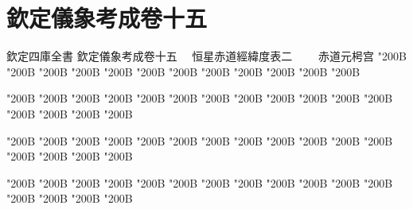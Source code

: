 \chapter*{欽定儀象考成卷十五}
\begin{正文}
欽定四庫全書
欽定儀象考成卷十五
　恒星赤道經緯度表二
　　赤道元枵宫
\char"200B\relax{}
\char"200B\relax{}
\char"200B\relax{}
\char"200B\relax{}
\char"200B\relax{}
\char"200B\relax{}
\char"200B\relax{}
\char"200B\relax{}
\char"200B\relax{}
\char"200B\relax{}
\char"200B\relax{}
\char"200B\relax
\par
\end{正文}\clearpage
{}
\begin{正文}
\char"200B\relax{}
\char"200B\relax{}
\char"200B\relax{}
\char"200B\relax{}
\char"200B\relax{}
\char"200B\relax{}
\char"200B\relax{}
\char"200B\relax{}
\char"200B\relax{}
\char"200B\relax{}
\char"200B\relax{}
\char"200B\relax{}
\char"200B\relax{}
\char"200B\relax{}
\char"200B\relax{}
\char"200B\relax
{}\par
\end{正文}\clearpage
{}
\begin{正文}
\char"200B\relax{}
\char"200B\relax{}
\char"200B\relax{}
\char"200B\relax{}
\char"200B\relax{}
\char"200B\relax{}
\char"200B\relax{}
\char"200B\relax{}
\char"200B\relax{}
\char"200B\relax{}
\char"200B\relax{}
\char"200B\relax{}
\char"200B\relax{}
\char"200B\relax{}
\char"200B\relax{}
\char"200B\relax
{}\par
\end{正文}\clearpage
{}
\begin{正文}
\char"200B\relax{}
\char"200B\relax{}
\char"200B\relax{}
\char"200B\relax{}
\char"200B\relax{}
\char"200B\relax{}
\char"200B\relax{}
\char"200B\relax{}
\char"200B\relax{}
\char"200B\relax{}
\char"200B\relax{}
\char"200B\relax{}
\char"200B\relax{}
\char"200B\relax{}
\char"200B\relax{}
\char"200B\relax
{}\par
\end{正文}\clearpage
